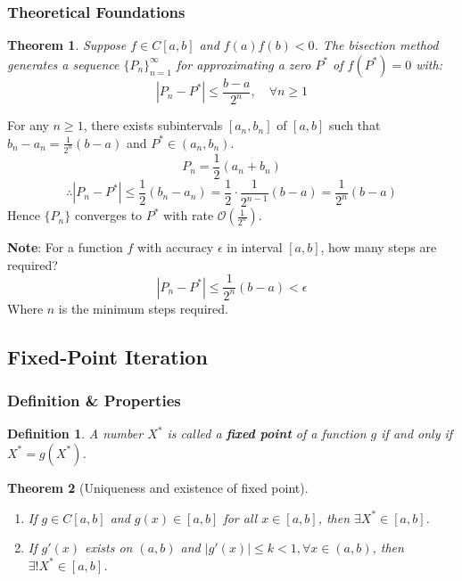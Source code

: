 \documentclass[12pt, a4paper]{article}
\makeatletter
\theoremstyle{break}
\newtheorem{theorem}{Theorem}[section]
\newtheorem{definition}{Definition}[section]
\renewenvironment{proof}[1][\proofname]{\par
  \pushQED{\qed}%
  \normalfont \topsep6\p@\@plus6\p@\relax
  \trivlist
  \item[\hskip\labelsep\bfseries #1\@addpunct{.}]\mbox{}\newline\ignorespaces
}{%
  \popQED\endtrivlist\@endpefalse
}
\makeatother
\begin{document}
\subsubsection{Theoretical Foundations}

\begin{theorem}
Suppose $f \in C[a,b]$ and $f(a)f(b) < 0$.
The bisection method generates a sequence $\{P_n\}_{n = 1}^{\infty}$ for approximating a zero $P^*$ of $f(P^*) = 0$ with:
\[ |P_n - P^*| \le \frac{b-a}{2^n}, \quad \forall n \ge 1 \]
\end{theorem}

\begin{proof}
For any $n \ge 1$, there exists subintervals $[a_n, b_n]$ of $[a, b]$ such that $b_n - a_n = \frac{1}{2^n} (b-a)$ and $P^* \in (a_n,b_n)$.
\[ P_n = \frac{1}{2} (a_n + b_n) \]
\[ \therefore |P_n - P^*| \le \frac{1}{2} (b_n - a_n) = \frac{1}{2} \cdot \frac{1}{2^{n-1}} (b-a) = \frac{1}{2^n} (b-a) \]
Hence $\{P_n\}$ converges to $P^*$ with rate $\mathcal{O}\left(\frac{1}{2^n}\right)$.
\end{proof}

\noindent \textbf{Note}: For a function $f$ with accuracy $\epsilon$ in interval $[a ,b]$, how many steps are required?
\[ |P_n - P^*| \le \frac{1}{2^n} (b-a) < \epsilon \]
Where $n$ is the minimum steps required.

\subsection{Fixed-Point Iteration}

\subsubsection{Definition \& Properties}
\begin{definition}
A number $X^*$ is called a \textbf{fixed point} of a function $g$ if and only if $X^* = g(X^*)$.
\end{definition}

\begin{theorem}[Uniqueness and existence of fixed point] \leavevmode
\begin{enumerate}
    \item If $g \in C[a,b]$ and $g(x) \in [a ,b]$ for all $x \in [a,b]$, then $\exists X^{*} \in [a ,b]$.
    \item If $g'(x)$ exists on $(a ,b)$ and $|g'(x)| \le k < 1, \forall x \in (a ,b)$, then $\exists! X^* \in [a ,b]$.
\end{enumerate}
\end{theorem}
\end{document}
